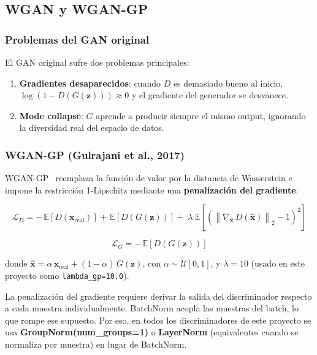 \documentclass[a4paper,11pt]{article}
\begin{document}
\subsection{WGAN y WGAN-GP}

\subsubsection{Problemas del GAN original}

El GAN original sufre dos problemas principales:

\begin{enumerate}
    \item \textbf{Gradientes desaparecidos}: cuando $D$ es demasiado bueno al
          inicio, $\log(1-D(G(\bm{z})))\approx 0$ y el gradiente del generador
          se desvanece.
    \item \textbf{Mode collapse}: $G$ aprende a producir siempre el mismo output,
          ignorando la diversidad real del espacio de datos.
\end{enumerate}

\subsubsection{WGAN-GP (Gulrajani et al., 2017)}

WGAN-GP~\cite{gulrajani2017} reemplaza la función de valor por la distancia
de Wasserstein e impone la restricción 1-Lipschitz mediante una
\textbf{penalización del gradiente}:

\begin{equation}
    \label{eq:wgangp_loss}
    \mathcal{L}_D =
    -\,\mathbb{E}\!\left[D(\bm{x}_{\text{real}})\right]
    +\,\mathbb{E}\!\left[D(G(\bm{z}))\right]
    +\;\lambda\;\mathbb{E}\!\left[\!\left(\left\|\nabla_{\hat{\bm{x}}}\,
    D(\hat{\bm{x}})\right\|_2 - 1\right)^2\right]
\end{equation}

\begin{equation}
    \label{eq:wgangp_g}
    \mathcal{L}_G = -\,\mathbb{E}\!\left[D(G(\bm{z}))\right]
\end{equation}

donde $\hat{\bm{x}} = \alpha\,\bm{x}_{\text{real}} + (1-\alpha)\,G(\bm{z})$,
con $\alpha\sim\mathcal{U}[0,1]$, y $\lambda=10$ (usado en este proyecto
como \texttt{lambda\_gp=10.0}).

\begin{tcolorbox}[colback=orange!5!white, colframe=orange!60!black,
                  title=Nota técnica: BatchNorm $\times$ WGAN-GP]
La penalización del gradiente requiere derivar la salida del discriminador
respecto a cada muestra individualmente. BatchNorm acopla las muestras del
batch, lo que rompe ese supuesto. Por eso, en todos los discriminadores de este
proyecto se usa \textbf{GroupNorm(num\_groups=1)} o \textbf{LayerNorm}
(equivalentes cuando se normaliza por muestra) en lugar de BatchNorm.
\end{tcolorbox}
\end{document}
